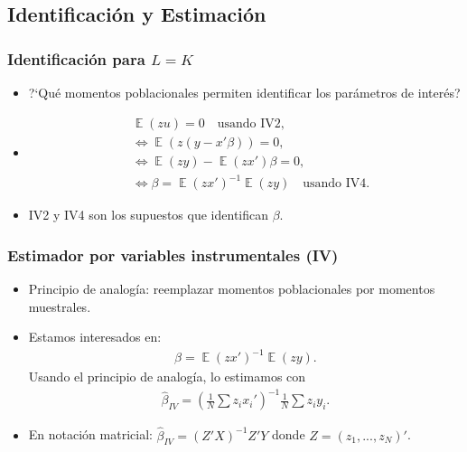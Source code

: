 \documentclass[t, compress, spanish, aspectratio=169]{beamer}
\DeclareMathOperator{\E}{\mathbb{E}}
\begin{document}
\subsection{Identificaci\'on y Estimaci\'on}
\begin{frame}
    \frametitle{Identificaci\'on para $L=K$}
    \begin{itemize}
        \item ?`Qu\'e momentos poblacionales permiten identificar los par\'ametros de inter\'es?
        \item [] <2->
        \begin{align*}
        		&\E(z u)=0 \quad \text{usando IV2},\\
        		&\iff \E(z (y-x'\beta)) =0,\\
        		&\iff \E(z y)-\E(z x')\beta =0,\\
        		&\iff \beta=\E(z x')^{-1}\E(z y)\quad \text{usando IV4}.
        \end{align*}
        \item  <2-> IV2 y IV4 son los supuestos que identifican $\beta$.
    \end{itemize}
\end{frame}
\begin{frame}
    \frametitle{Estimador por variables instrumentales (IV)}
    \begin{itemize}
        \item  Principio de analog\'ia: reemplazar momentos poblacionales por momentos muestrales.
        \item [] <2-> Estamos interesados en:
        \begin{align*}
        		\beta =\E(z x')^{-1}\E(z y).
        \end{align*}
        Usando el principio de analog\'ia, lo estimamos con
        \begin{align*}
        		\hat \beta_{IV} 
        		=\left(
        		\frac{1}{N} \sum z_i x_i'
        		\right)^{-1}\frac{1}{N}\sum z_i y_i .
        \end{align*}
        \item <2-> En notaci\'on matricial: $\hat \beta_{IV}=(Z'X)^{-1}Z'Y$ donde $Z=(z_1,...,z_N)'$.
    \end{itemize}
\end{frame}
\end{document}
